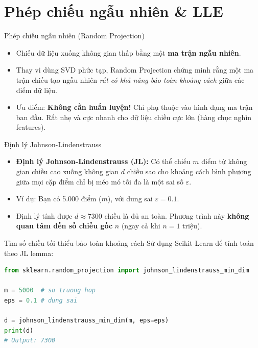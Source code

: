 \documentclass[aspectratio=169]{beamer}
\begin{document}
\section{Phép chiếu ngẫu nhiên \& LLE}
\begin{frame}{Phép chiếu ngẫu nhiên (Random Projection)}
    \begin{itemize}
        \item Chiếu dữ liệu xuống không gian thấp bằng một \textbf{ma trận ngẫu nhiên}.
        \item Thay vì dùng SVD phức tạp, Random Projection chứng minh rằng một ma trận chiếu tạo ngẫu nhiên \textit{rất có khả năng bảo toàn khoảng cách} giữa các điểm dữ liệu.
        \item Ưu điểm: \textbf{Không cần huấn luyện!} Chỉ phụ thuộc vào hình dạng ma trận ban đầu. Rất nhẹ và cực nhanh cho dữ liệu chiều cực lớn (hàng chục nghìn features).
    \end{itemize}
\end{frame}

\begin{frame}{Định lý Johnson-Lindenstrauss}
    \begin{itemize}
        \item \textbf{Định lý Johnson-Lindenstrauss (JL):} Có thể chiếu $m$ điểm từ không gian chiều cao xuống không gian $d$ chiều sao cho khoảng cách bình phương giữa mọi cặp điểm chỉ bị méo mó tối đa là một sai số $\varepsilon$.
        \item Ví dụ: Bạn có 5.000 điểm ($m$), với dung sai $\varepsilon=0.1$.
        \item Định lý tính được $d \approx 7300$ chiều là đủ an toàn. Phương trình này \textbf{không quan tâm đến số chiều gốc} $n$ (ngay cả khi $n = 1$ triệu).
    \end{itemize}
\end{frame}

\begin{frame}[fragile]{Tìm số chiều tối thiểu bảo toàn khoảng cách}
    Sử dụng Scikit-Learn để tính toán theo JL lemma:
    \begin{lstlisting}[language=Python]
from sklearn.random_projection import johnson_lindenstrauss_min_dim

m = 5000  # so truong hop
eps = 0.1 # dung sai

d = johnson_lindenstrauss_min_dim(m, eps=eps)
print(d) 
# Output: 7300
    \end{lstlisting}
\end{frame}
\end{document}
